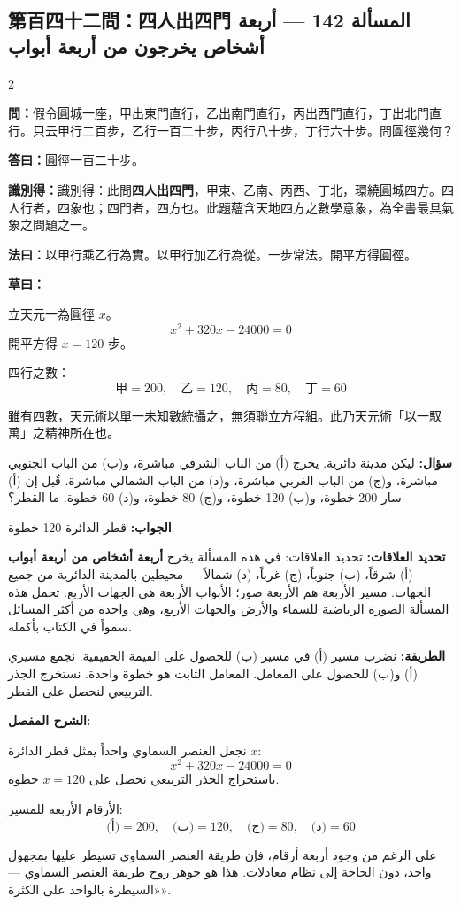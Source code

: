 \documentclass[11pt,a4paper]{article}
\newcommand{\ar}[1]{\arabicfont\beginR #1\endR}
\newcommand{\arb}[1]{\textbf{\arabicfont\beginR #1\endR}}
\newcommand{\arnote}[1]{\textcolor{arabicblue}{\ar{#1}}}
\newcommand{\wen}[1]{\par\noindent\textbf{\textcolor{probcolor}{問：}}{#1}\par}
\newcommand{\da}[1]{\par\noindent\textbf{\textcolor{anscolor}{答曰：}}{#1}\par}
\newcommand{\fayue}[1]{\par\noindent\textbf{\textcolor{methodcolor}{法曰：}}{#1}\par}
\newcommand{\caoyue}[1]{\par\noindent\textbf{草曰：}{#1}\par}
\newcommand{\zhi}[1]{\par\noindent\textbf{識別得：}{#1}\par}
\newcommand{\arwen}[1]{\par\noindent\arb{سؤال: }\arnote{#1}\par}
\newcommand{\arjwb}[1]{\par\noindent\arb{الجواب: }\arnote{#1}\par}
\newcommand{\arqwd}[1]{\par\noindent\arb{الطريقة: }\arnote{#1}\par}
\newcommand{\arshr}[1]{\par\noindent\arb{الشرح المفصل: }\arnote{#1}\par}
\newcommand{\arfl}[1]{\par\noindent\arb{تحديد العلاقات: }\arnote{#1}\par}
\begin{document}
\subsection*{第百四十二問：四人出四門 \hfill \ar{المسألة 142 — أربعة أشخاص يخرجون من أربعة أبواب}}

\begin{paracol}{2}

\begin{leftcolumn}
\wen{假令圓城一座，甲出東門直行，乙出南門直行，丙出西門直行，丁出北門直行。只云甲行二百步，乙行一百二十步，丙行八十步，丁行六十步。問圓徑幾何？}

\da{圓徑一百二十步。}

\zhi{識別得：此問\textbf{四人出四門}，甲東、乙南、丙西、丁北，環繞圓城四方。四人行者，四象也；四門者，四方也。此題蘊含天地四方之數學意象，為全書最具氣象之問題之一。}

\fayue{以甲行乘乙行為實。以甲行加乙行為從。一步常法。開平方得圓徑。}

\caoyue{
立天元一為圓徑 $x$。
$$x^2 + 320x - 24000 = 0$$
開平方得 $x = 120$ 步。

四行之數：
$$\text{甲} = 200, \quad \text{乙} = 120, \quad \text{丙} = 80, \quad \text{丁} = 60$$

雖有四數，天元術以單一未知數統攝之，無須聯立方程組。此乃天元術「以一馭萬」之精神所在也。}
\end{leftcolumn}

\begin{rightcolumn}
\arwen{ليكن مدينة دائرية. يخرج (أ) من الباب الشرقي مباشرة، و(ب) من الباب الجنوبي مباشرة، و(ج) من الباب الغربي مباشرة، و(د) من الباب الشمالي مباشرة. قُيل إن (أ) سار 200 خطوة، و(ب) 120 خطوة، و(ج) 80 خطوة، و(د) 60 خطوة. ما القطر؟}

\arjwb{قطر الدائرة 120 خطوة.}

\arfl{تحديد العلاقات: في هذه المسألة يخرج \textbf{أربعة أشخاص من أربعة أبواب} — (أ) شرقاً، (ب) جنوباً، (ج) غرباً، (د) شمالاً — محيطين بالمدينة الدائرية من جميع الجهات. مسير الأربعة هم الأربعة صور؛ الأبواب الأربعة هي الجهات الأربع. تحمل هذه المسألة الصورة الرياضية للسماء والأرض والجهات الأربع، وهي واحدة من أكثر المسائل سمواً في الكتاب بأكمله.}

\arqwd{نضرب مسير (أ) في مسير (ب) للحصول على القيمة الحقيقية. نجمع مسيري (أ) و(ب) للحصول على المعامل. المعامل الثابت هو خطوة واحدة. نستخرج الجذر التربيعي لنحصل على القطر.}

\arshr{نجعل العنصر السماوي واحداً يمثل قطر الدائرة $x$:
$$x^2 + 320x - 24000 = 0$$
باستخراج الجذر التربيعي نحصل على $x = 120$ خطوة.

الأرقام الأربعة للمسير:
$$\text{(أ)} = 200, \quad \text{(ب)} = 120, \quad \text{(ج)} = 80, \quad \text{(د)} = 60$$

على الرغم من وجود أربعة أرقام، فإن طريقة العنصر السماوي تسيطر عليها بمجهول واحد، دون الحاجة إلى نظام معادلات. هذا هو جوهر روح طريقة العنصر السماوي — «السيطرة بالواحد على الكثرة».}
\end{rightcolumn}

\end{paracol}
\end{document}
